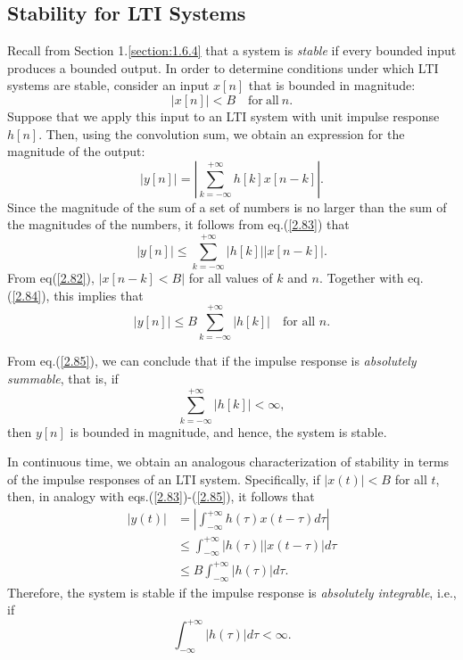 \documentclass[a4paper,10pt,twoside]{book}
\begin{document}
\subsection{Stability for LTI Systems}

Recall from Section 1.\ref{section:1.6.4} that a system is \textit{stable} if every bounded input produces a bounded output. In order to determine conditions under which LTI systems are stable, consider an input $x[n]$ that is bounded in magnitude:
\begin{equation}
    |x[n]|<B\quad\mathrm{for~all~}n.
    \label{2.82}
\end{equation}
Suppose that we apply this input to an LTI system with unit impulse response $h[n]$. Then, using the convolution sum, we obtain an expression for the magnitude of the output:
\begin{equation}
    \left|y[n]\right|=\left|\sum_{k=-\infty}^{+\infty}h[k]x[n-k]\right|.
    \label{2.83}
\end{equation}
Since the magnitude of the sum of a set of numbers is no larger than the sum of the magnitudes of the numbers, it follows from eq.\;(\ref{2.83}) that
\begin{equation}
    |y[n]|\leq\sum_{k=-\infty}^{+\infty}|h[k]||x[n-k]|.
    \label{2.84}
\end{equation}
From eq\;(\ref{2.82}), $|x[n-k]<B|$ for all values of $k$ and $n$. Together with eq.\;(\ref{2.84}), this implies that
\begin{equation}
    |y[n]|\leq B\sum_{k=-\infty}^{+\infty}|h[k]|\quad\text{for all }n.
    \label{2.85}
\end{equation}

From eq.\;(\ref{2.85}), we can conclude that if the impulse response is \textit{absolutely summable}, that is, if
\begin{equation}
    \sum_{k=-\infty}^{+\infty}|h[k]|<\infty,
    \label{2.86}
\end{equation}
then $y[n]$ is bounded in magnitude, and hence, the system is stable.

In continuous time, we obtain an analogous characterization of stability in terms of the impulse responses of an LTI system. Specifically, if $|x(t)|<B$ for all $t$, then, in analogy with eqs.\;(\ref{2.83})-(\ref{2.85}), it follows that $$\begin{aligned}|y(t)|&=\left|\int_{-\infty}^{+\infty}h(\tau)x(t-\tau)d\tau\right|\\&\leq\int_{-\infty}^{+\infty}|h(\tau)||x(t-\tau)|d\tau\\&\leq B\int_{-\infty}^{+\infty}|h(\tau)|d\tau.\end{aligned}$$ Therefore, the system is stable if the impulse response is \textit{absolutely integrable}, i.e., if
\begin{equation}
    \int_{-\infty}^{+\infty}|h(\tau)|d\tau<\infty.
    \label{2.87}
\end{equation}
\end{document}
